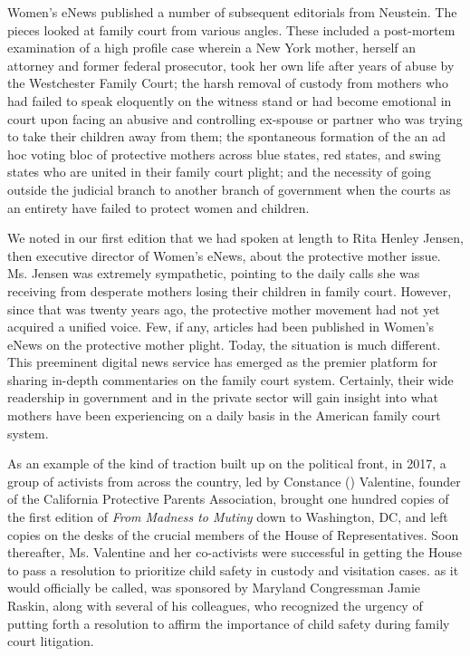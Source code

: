 Women's eNews published a number of subsequent editorials from
Neustein. The pieces looked at family court from various angles. These
included a post-mortem examination of a high profile case wherein a
New York mother, herself an attorney and former federal prosecutor,
took her own life after years of abuse by the Westchester Family Court;
the harsh removal of custody from mothers who had failed to speak
eloquently on the witness stand or had become emotional in court upon
facing an abusive and controlling ex-spouse or partner who was trying
to take their children away from them; the spontaneous formation of
the  an ad hoc voting bloc of protective mothers across
blue states, red states, and swing states who are united in their family
court plight; and the necessity of going outside the judicial branch to
another branch of government when the courts as an entirety have failed
to protect women and children. \pfl{}

\enlargethispage{5pt}We noted in our first edition that we had spoken at length to Rita
Henley Jensen, then executive director of Women's eNews, about the
protective mother issue. Ms. Jensen was extremely sympathetic, pointing to the daily calls she was receiving from desperate mothers losing
their children in family court. However, since that was twenty years
ago, the protective mother movement had not yet acquired a unified
voice. Few, if any, articles had been published in Women's eNews on
the protective mother plight. Today, the situation is much different. This
preeminent digital news service has emerged as the premier platform for
sharing in-depth commentaries on the family court system. Certainly,
their wide readership in government and in the private sector will gain
insight into what mothers have been experiencing on a daily basis in the
American family court system. \pfl{}\newpage{}

\vspace{4em}


\noindent{}As an example of the kind of traction built up on the political front,
in 2017, a group of activists from across the country, led by Constance
() Valentine, founder of the California Protective Parents Association,
brought one hundred copies of the first edition of \textit{From Madness to
Mutiny} down to Washington, DC, and left copies on the desks of the
crucial members of the House of Representatives. Soon thereafter, Ms.
Valentine and her co-activists were successful in getting the House to
pass a resolution to prioritize child safety in custody and visitation cases.
 as it would officially be called, was sponsored by Maryland Congressman Jamie Raskin, along with several of his colleagues,
who recognized the urgency of putting forth a resolution to affirm the
importance of child safety during family court litigation. \pfl{}

